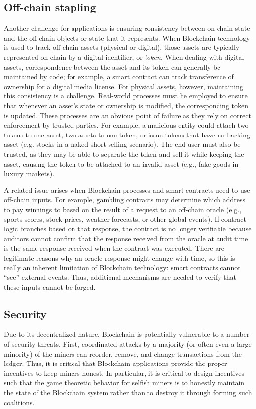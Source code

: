 \subsection{Off-chain stapling}
Another challenge for applications is ensuring consistency between on-chain state and the off-chain objects or state that it represents.  When Blockchain technology is used to track off-chain assets (physical or digital), those assets are typically represented on-chain by a digital identifier, or \textit{token}. When dealing with digital assets, correspondence between the asset and its token can generally be maintained by code; for example, a smart contract can track transference of ownership for a digital media license. For physical assets, however, maintaining this consistency is a challenge. Real-world processes must be employed to ensure that whenever an asset's state or ownership is modified, the corresponding token is updated. These processes are an obvious point of failure as they rely on correct enforcement by trusted parties. For example, a malicious entity could attach two tokens to one asset, two assets to one token, or issue tokens that have no backing asset (e.g. stocks in a naked short selling scenario). The end user must also be trusted, as they may be able to separate the token and sell it while keeping the asset, causing the token to be attached to an invalid asset (e.g., fake goods in luxury markets).

A related issue arises when Blockchain processes and smart contracts need to use off-chain inputs. For example, gambling contracts may determine which address to pay winnings to based on the result of a request to an off-chain oracle (e.g., sports scores, stock prices, weather forecasts, or other global events). If contract logic branches based on that response, the contract is no longer verifiable because auditors cannot confirm that the response received from the oracle at audit time is the same response received when the contract was executed. There are legitimate reasons why an oracle response might change with time, so this is really an inherent limitation of Blockchain technology: smart contracts cannot ``see'' external events.  Thus, additional mechanisms are needed to verify that these inputs cannot be forged.

\subsection{Security}
Due to its decentralized nature, Blockchain is potentially vulnerable to a number of security threats.  First, coordinated attacks by a majority (or often even a large minority) of the miners can reorder, remove, and change transactions from the ledger. Thus, it is critical that Blockchain applications provide the proper incentives to keep miners honest.  In particular, it is critical to design incentives such that the game theoretic behavior for selfish miners is to honestly maintain the state of the Blockchain system rather than to destroy it through forming such coalitions.

